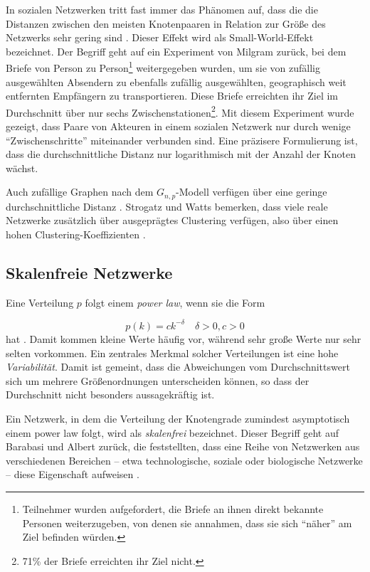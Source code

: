 In sozialen Netzwerken tritt fast immer das Ph\"anomen auf, dass die
die Distanzen zwischen den meisten Knotenpaaren in Relation zur
Gr\"o{\ss}e des Netzwerks sehr gering sind \cite{newman:167}. Dieser Effekt wird als
Small-World-Effekt bezeichnet. Der Begriff geht auf ein Experiment von 
Milgram zur\"uck, bei dem Briefe von Person zu
Person\footnote{Teilnehmer wurden aufgefordert, die Briefe an ihnen
  direkt bekannte Personen weiterzugeben, von denen sie annahmen, dass
  sie sich ``näher'' am Ziel befinden würden.} weitergegeben
wurden, um sie von zufällig ausgewählten Absendern zu ebenfalls
zufällig ausgewählten, geographisch weit entfernten Empfängern
zu transportieren\cite{Travers1969}. Diese Briefe erreichten ihr Ziel
im Durchschnitt über nur sechs Zwischenstationen\footnote{71\% der
  Briefe erreichten ihr Ziel nicht.}. Mit diesem Experiment wurde
gezeigt, dass Paare von Akteuren in einem sozialen Netzwerk nur durch
wenige ``Zwischenschritte'' miteinander verbunden
sind. Eine präzisere Formulierung
ist, dass die durchschnittliche Distanz nur logarithmisch mit der
Anzahl der Knoten wächst.

Auch zufällige Graphen nach dem $G_{n,p}$-Modell verfügen über eine geringe
durchschnittliche Distanz \cite{Baumann2004}. Strogatz und Watts bemerken, dass viele
reale Netzwerke zusätzlich über ausgeprägtes Clustering
verfügen, also über einen hohen
Clustering-Koeffizienten \cite{Watts1998}.

\subsection{Skalenfreie Netzwerke}
\label{sec:skal-netzw}

Eine Verteilung $p$ folgt einem \emph{power law}, wenn sie die Form

\begin{equation}
  \label{eq:8}
  p(k) = ck^{-\delta} \quad \delta > 0, c > 0
\end{equation}
hat \cite{Baumann2004}. Damit kommen kleine Werte häufig vor,
während sehr große Werte nur sehr selten vorkommen.  Ein zentrales
Merkmal solcher Verteilungen ist eine hohe
\emph{Variabilität}. Damit ist gemeint, dass die Abweichungen vom
Durchschnittswert sich um mehrere Größenordnungen unterscheiden
können, so dass der Durchschnitt nicht besonders aussagekräftig
ist.

Ein Netzwerk, in dem die Verteilung der Knotengrade zumindest
asymptotisch einem power law
folgt, wird als \emph{skalenfrei} bezeichnet. Dieser Begriff geht auf
Barabasi und Albert zurück, die feststellten, dass eine Reihe von
Netzwerken aus verschiedenen Bereichen -- etwa technologische, soziale
oder biologische Netzwerke -- diese Eigenschaft
aufweisen \cite{Barabasi1999}.

